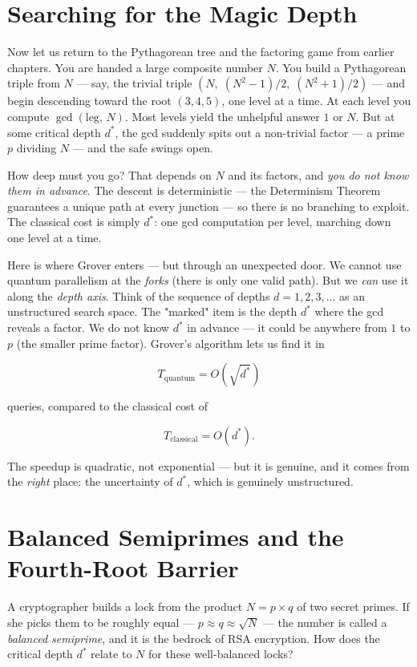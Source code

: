 \documentclass[11pt,twoside,openright]{book}
\theoremstyle{definition}
\theoremstyle{remark}
\begin{document}
\section{Searching for the Magic Depth}

Now let us return to the Pythagorean tree and the factoring game from earlier chapters. You are handed a large composite number $N$. You build a Pythagorean triple from $N$ --- say, the trivial triple $(N,\; (N^2 - 1)/2,\; (N^2 + 1)/2)$ --- and begin descending toward the root $(3, 4, 5)$, one level at a time. At each level you compute $\gcd(\text{leg},\, N)$. Most levels yield the unhelpful answer $1$ or $N$. But at some critical depth $d^*$, the gcd suddenly spits out a non-trivial factor --- a prime $p$ dividing $N$ --- and the safe swings open.

How deep must you go? That depends on $N$ and its factors, and \textit{you do not know them in advance}. The descent is deterministic --- the Determinism Theorem guarantees a unique path at every junction --- so there is no branching to exploit. The classical cost is simply $d^*$: one gcd computation per level, marching down one level at a time.

Here is where Grover enters --- but through an unexpected door. We cannot use quantum parallelism at the \textit{forks} (there is only one valid path). But we \textit{can} use it along the \textit{depth axis}. Think of the sequence of depths $d = 1, 2, 3, \ldots$ as an unstructured search space. The "marked" item is the depth $d^*$ where the gcd reveals a factor. We do not know $d^*$ in advance --- it could be anywhere from $1$ to $p$ (the smaller prime factor). Grover's algorithm lets us find it in

\[T_{\text{quantum}} = O\!\left(\sqrt{d^*}\right)\]

queries, compared to the classical cost of

\[T_{\text{classical}} = O(d^*).\]

The speedup is quadratic, not exponential --- but it is genuine, and it comes from the \textit{right} place: the uncertainty of $d^*$, which is genuinely unstructured.



\section{Balanced Semiprimes and the Fourth-Root Barrier}

A cryptographer builds a lock from the product $N = p \times q$ of two secret primes. If she picks them to be roughly equal --- $p \approx q \approx \sqrt{N}$ --- the number is called a \textit{balanced semiprime}, and it is the bedrock of RSA encryption. How does the critical depth $d^*$ relate to $N$ for these well-balanced locks?
\end{document}
